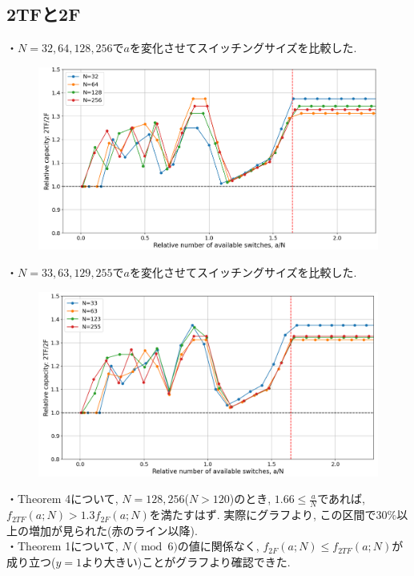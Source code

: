 \documentclass[11pt, a4paper]{jarticle}
\begin{document}
\subsection{2TFと2F}
・$N=32, 64, 128, 256$で$a$を変化させてスイッチングサイズを比較した. 
\begin{figure}[H]
  \centering
  \includegraphics[width=0.8\linewidth]{compare_relative_2f_1.png}
\end{figure}

・$N=33, 63, 129, 255$で$a$を変化させてスイッチングサイズを比較した.
\begin{figure}[H]
  \centering
  \includegraphics[width=0.8\linewidth]{compare_relative_2f_2.png}
\end{figure}

\noindent ・Theorem 4について, $N=128, 256$($N>120$)のとき, $1.66 \leq \frac{a}{N}$であれば, $f_{2TF}(a; N) > 1.3f_{2F}(a; N)$を満たすはず. 
実際にグラフより, この区間で$30\%$以上の増加が見られた(赤のライン以降).\\
・Theorem 1について, $N \pmod{6}$の値に関係なく, $f_{2F}(a; N) \leq f_{2TF}(a; N)$が成り立つ($y=1$より大きい)ことがグラフより確認できた. 
\end{document}
